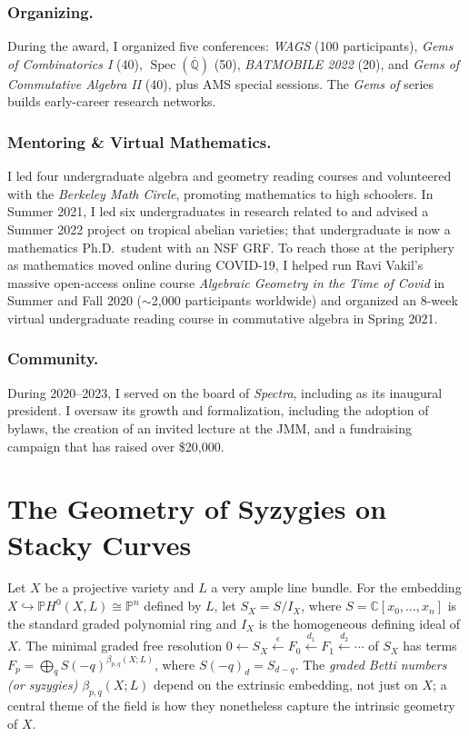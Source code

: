 \documentclass[11pt,reqno]{amsart}
\theoremstyle{remark}
\newcommand{\Spec}{\operatorname{Spec}}
\newcommand{\CC}{\mathbb{C}}
\newcommand{\PP}{\mathbb{P}}
\newcommand{\QQ}{\mathbb{Q}}
\begin{document}
\subsubsection{Organizing.} During the award, I organized five conferences: \textit{WAGS} (100 participants), \textit{Gems of Combinatorics I} (40), $\Spec(\overline{\QQ})$ (50), \textit{BATMOBILE 2022} (20), and \textit{Gems of Commutative Algebra II} (40), plus AMS special sessions. The \textit{Gems of} series builds early-career research networks.

\subsubsection{Mentoring \& Virtual Mathematics.} I led four undergraduate algebra and geometry reading courses and volunteered with the \textit{Berkeley Math Circle}, promoting mathematics to high schoolers. In Summer 2021, I led six undergraduates in research related to \cite{BBCMMW24} and advised a Summer 2022 project on tropical abelian varieties; that undergraduate is now a mathematics Ph.D.\ student with an NSF GRF. To reach those at the periphery as mathematics moved online during COVID-19, I helped run Ravi Vakil's massive open-access online course \textit{Algebraic Geometry in the Time of Covid} in Summer and Fall 2020 ($\sim$2,000 participants worldwide) and organized an 8-week virtual undergraduate reading course in commutative algebra in Spring 2021.

\subsubsection{Community.}  During 2020--2023, I served on the board of \textit{Spectra}, including as its inaugural president. I oversaw its growth and formalization, including the adoption of bylaws, the creation of an invited lecture at the JMM, and a fundraising campaign that has raised over \$20,000.

\section{The Geometry of Syzygies on Stacky Curves}\label{sec:syzygies-on-stacks}
Let $X$ be a projective variety and $L$ a very ample line bundle. For the embedding $X \hookrightarrow \PP H^{0}(X,L)\cong \PP^{n}$ defined by $L$, let $S_{X}=S/I_{X}$, where $S=\CC[x_{0},\ldots,x_{n}]$ is the standard graded polynomial ring and $I_{X}$ is the homogeneous defining ideal of $X$. The minimal graded free resolution $0\leftarrow S_X\xleftarrow{\,\epsilon\,}F_0\xleftarrow{\,d_1\,}F_1\xleftarrow{\,d_2\,}\cdots$ of $S_X$ has terms $F_p=\bigoplus_q S(-q)^{\beta_{p,q}(X;L)}$, where $S(-q)_d=S_{d-q}$. The \emph{graded Betti numbers (or syzygies)} $\beta_{p,q}(X;L)$ depend on the extrinsic embedding, not just on $X$; a central theme of the field is how they nonetheless capture the intrinsic geometry of $X$.
\end{document}
